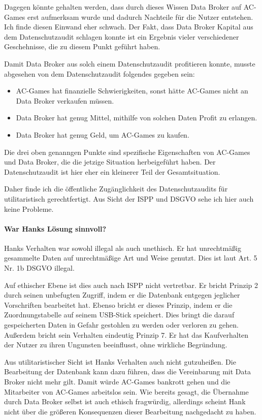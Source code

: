 Dagegen könnte gehalten werden, dass durch dieses Wissen Data Broker auf AC-Games erst aufmerksam wurde und dadurch Nachteile für die Nutzer entstehen.
Ich finde diesen Einwand eher schwach. Der Fakt, dass Data Broker Kapital aus dem Datenschutzaudit schlagen konnte ist ein Ergebnis vieler verschiedener Geschehnisse, die zu diesem Punkt geführt haben.

Damit Data Broker aus solch einem Datenschutzaudit profitieren konnte, musste abgesehen von dem Datenschutzaudit folgendes gegeben sein:
\begin{itemize}
    \item AC-Games hat finanzielle Schwierigkeiten, sonst hätte AC-Games nicht an Data Broker verkaufen müssen. 
    \item Data Broker hat genug Mittel, mithilfe von solchen Daten Profit zu erlangen.
    \item Data Broker hat genug Geld, um AC-Games zu kaufen.
\end{itemize}
Die drei oben genanngen Punkte sind spezifische Eigenschaften von AC-Games und Data Broker, die die jetzige Situation herbeigeführt haben. 
Der Datenschutzaudit ist hier eher ein kleinerer Teil der Gesamtsituation.

Daher finde ich die öffentliche Zugänglichkeit des Datenschutzaudits für utilitaristisch gerechtfertigt. Aus Sicht der ISPP und DSGVO sehe ich hier auch keine Probleme.

\paragraph*{War Hanks Lösung sinnvoll? \cite{kees_faites_2017}}

Hanks Verhalten war sowohl illegal als auch unethisch.
Er hat unrechtmäßig gesammelte Daten auf unrechtmäßige Art und Weise genutzt.
Dies ist laut Art. 5 Nr. 1b DSGVO illegal.

Auf ethischer Ebene ist dies auch nach ISPP nicht vertretbar.
Er bricht Prinzip 2 durch seinen unbefugten Zugriff, indem er die Datenbank entgegen jeglicher Vorschriften bearbeitet hat. Ebenso bricht er dieses Prinzip, indem er die Zuordnungstabelle auf seinem USB-Stick speichert.
Dies bringt die darauf gespeicherten Daten in Gefahr gestohlen zu werden oder verloren zu gehen.
Außerdem bricht sein Verhalten eindeutig Prinzip 7.
Er hat das Kaufverhalten der Nutzer zu ihren Ungunsten beeinflusst, ohne wirkliche Begründung.

Aus utilitaristischer Sicht ist Hanks Verhalten auch nicht gutzuheißen.
Die Bearbeitung der Datenbank kann dazu führen, dass die Vereinbarung mit Data Broker nicht mehr gilt. Damit würde AC-Games bankrott gehen und die Mitarbeiter von AC-Games arbeitslos sein.
Wie bereits gesagt, die Übernahme durch Data Broker selbst ist auch ethisch fragwürdig, allerdings scheint Hank nicht über die größeren Konsequenzen dieser Bearbeitung nachgedacht zu haben.

